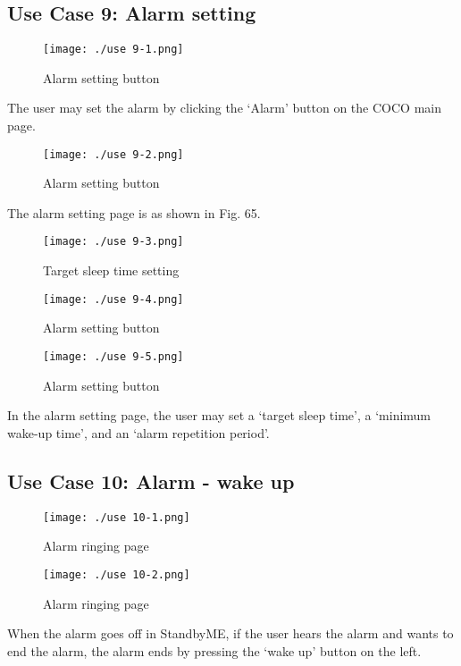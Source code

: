 \documentclass[conference]{IEEEtran}
\begin{document}
\subsection{Use Case 9: Alarm setting}

\begin{figure}[H]
\texttt{[image: ./use 9-1.png]}
\centering
\caption{Alarm setting button}
\end{figure}

The user may set the alarm by clicking the ‘Alarm' button on the COCO main page.

\begin{figure}[H]
\texttt{[image: ./use 9-2.png]}
\centering
\caption{Alarm setting button}
\end{figure}

The alarm setting page is as shown in Fig. 65.

\begin{figure}[H]
\texttt{[image: ./use 9-3.png]}
\centering
\caption{Target sleep time setting}
\end{figure}

\begin{figure}[H]
\texttt{[image: ./use 9-4.png]}
\centering
\caption{Alarm setting button}
\end{figure}

\begin{figure}[H]
\texttt{[image: ./use 9-5.png]}
\centering
\caption{Alarm setting button}
\end{figure}

In the alarm setting page, the user may set a ‘target sleep time', a ‘minimum wake-up time', and an ‘alarm repetition period'.

\subsection{Use Case 10: Alarm - wake up}

\begin{figure}[H]
\texttt{[image: ./use 10-1.png]}
\centering
\caption{Alarm ringing page}
\end{figure}

\begin{figure}[H]
\texttt{[image: ./use 10-2.png]}
\centering
\caption{Alarm ringing page}
\end{figure}

When the alarm goes off in StandbyME, if the user hears the alarm and wants to end the alarm, the alarm ends by pressing the ‘wake up' button on the left.
\end{document}
